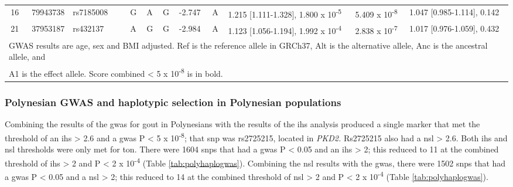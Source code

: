 \documentclass[]{report}
\begin{document}
\begin{landscape}
\begin{table}
{\begin{tabular}[t]{rrllllllllll}
\hspace{1em}16 & 79943738 & rs7185008 & \em{} & G & A & G & -2.747 & A & 1.215 [1.111-1.328], 1.800 x 10\textsuperscript{-5} & 5.409 x 10\textsuperscript{-8} & 1.047 [0.985-1.114], 0.142\\
\hspace{1em}21 & 37953187 & rs432137 & \em{} & A & G & G & -2.984 & A & 1.123 [1.056-1.194], 1.992 x 10\textsuperscript{-4} & 2.838 x 10\textsuperscript{-7} & 1.017 [0.976-1.059], 0.432\\
\bottomrule
\multicolumn{12}{l}{GWAS results are age, sex and BMI adjusted. Ref is the reference allele in GRCh37, Alt is the alternative allele, Anc is the ancestral allele, and}\\
\multicolumn{12}{l}{A1 is the effect allele. Score combined < 5 x 10\textsuperscript{-8} is in bold.}\\
\end{tabular}}
\end{table}
\end{landscape}

\subsubsection{Polynesian GWAS and haplotypic selection in Polynesian
populations}\label{polynesian-gwas-and-haplotypic-selection-in-polynesian-populations}

Combining the results of the \gls{gwas} for gout in Polynesians with the
results of the \gls{ihs} analysis produced a single marker that met the
threshold of an \textbar{}\gls{ihs}\textbar{} \textgreater{} 2.6 and a
\gls{gwas} P \textless{} 5 x 10\textsuperscript{-8}; that \gls{snp} was
rs2725215, located in \emph{PKD2.} Rs2725215 also had a
\textbar{}\gls{nsl}\textbar{} \textgreater{} 2.6. Both \gls{ihs} and
\gls{nsl} thresholds were only met for \gls{ton}. There were 1604
\glspl{snp} that had a \gls{gwas} P \textless{} 0.05 and an
\textbar{}\gls{ihs}\textbar{} \textgreater{} 2; this reduced to 11 at
the combined threshold of \textbar{}\gls{ihs}\textbar{} \textgreater{} 2
and P \textless{} 2 x 10\textsuperscript{-4} (Table
\ref{tab:polyhaplogwas}). Combining the \gls{nsl} results with the
\gls{gwas}, there were 1502 \glspl{snp} that had a \gls{gwas} P
\textless{} 0.05 and a \textbar{}\gls{nsl}\textbar{} \textgreater{} 2;
this reduced to 14 at the combined threshold of
\textbar{}\gls{nsl}\textbar{} \textgreater{} 2 and P \textless{} 2 x
10\textsuperscript{-4} (Table \ref{tab:polyhaplogwas}).
\end{document}
